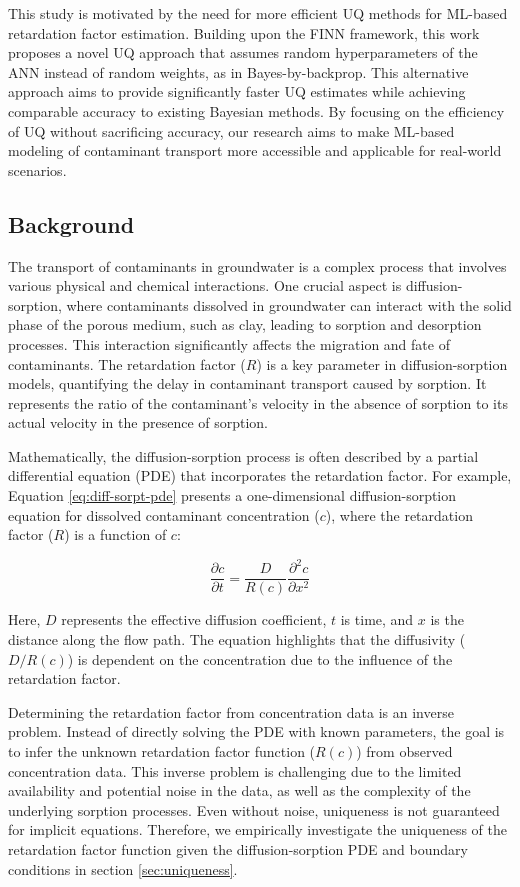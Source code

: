 \documentclass{article}
\begin{document}
This study is motivated by the need for more efficient UQ methods for ML-based retardation factor estimation. Building upon the FINN framework, this work proposes a novel UQ approach that assumes random hyperparameters of the ANN instead of random weights, as in Bayes-by-backprop. This alternative approach aims to provide significantly faster UQ estimates while achieving comparable accuracy to existing Bayesian methods. By focusing on the efficiency of UQ without sacrificing accuracy, our research aims to make ML-based modeling of contaminant transport more accessible and applicable for real-world scenarios.

\subsection{Background}
The transport of contaminants in groundwater is a complex process that involves various physical and chemical interactions. One crucial aspect is diffusion-sorption, where contaminants dissolved in groundwater can interact with the solid phase of the porous medium, such as clay, leading to sorption and desorption processes. This interaction significantly affects the migration and fate of contaminants.
The retardation factor ($R$) is a key parameter in diffusion-sorption models, quantifying the delay in contaminant transport caused by sorption. It represents the ratio of the contaminant's velocity in the absence of sorption to its actual velocity in the presence of sorption.

Mathematically, the diffusion-sorption process is often described by a partial differential equation (PDE) that incorporates the retardation factor. For example, Equation \eqref{eq:diff-sorpt-pde} presents a one-dimensional diffusion-sorption equation for dissolved contaminant concentration ($c$), where the retardation factor ($R$) is a function of $c$:

\begin{equation}
    \frac{\partial c}{\partial t} = \frac{D}{R(c)} \frac{\partial^2 c}{\partial x^2}
    \label{eq:diff-sorpt-pde}
\end{equation}

Here, $D$ represents the effective diffusion coefficient, $t$ is time, and $x$ is the distance along the flow path. The equation highlights that the diffusivity ($D/R(c)$) is dependent on the concentration due to the influence of the retardation factor.

Determining the retardation factor from concentration data is an inverse problem. Instead of directly solving the PDE with known parameters, the goal is to infer the unknown retardation factor function ($R(c)$) from observed concentration data. This inverse problem is challenging due to the limited availability and potential noise in the data, as well as the complexity of the underlying sorption processes. Even without noise, uniqueness is not guaranteed for implicit equations. Therefore, we empirically investigate the uniqueness of the retardation factor function given the diffusion-sorption PDE and boundary conditions in section \ref{sec:uniqueness}.
\end{document}
